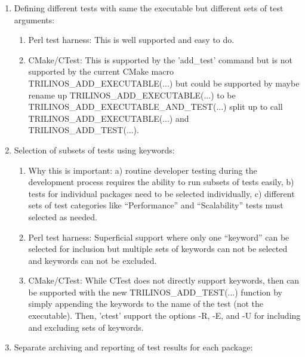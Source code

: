 \documentclass[pdf,ps2pdf,11pt]{SANDreport}
\begin{document}
\begin{enumerate}

{}\item Defining different tests with same the executable but
different sets of test arguments:

  \begin{enumerate}

  {}\item Perl test harness: This is well supported and easy to do.

  {}\item CMake/CTest: This is supported by the 'add\_test' command
  but is not supported by the current CMake macro
  TRILINOS\_ADD\_EXECUTABLE(...) but could be supported by maybe
  rename up TRILINOS\_ADD\_EXECUTABLE(...) to be
  TRILINOS\_ADD\_EXECUTABLE\_AND\_TEST(...) split up to call
  TRILINOS\_ADD\_EXECUTABLE(...) and TRILINOS\_ADD\_TEST(...).

  \end{enumerate}

{}\item Selection of subsets of tests using keywords:

  \begin{enumerate}

  {}\item Why this is important: a) routine developer testing during
  the development process requires the ability to run subsets of tests
  easily, b) tests for individual packages need to be selected
  individually, c) different sets of test categories like
  ``Performance'' and ``Scalability'' tests must selected as needed.

  {}\item Perl test harness: Superficial support where only one
  ``keyword'' can be selected for inclusion but multiple sets of
  keywords can not be selected and keywords can not be excluded.

  {}\item CMake/CTest: While CTest does not directly support keywords,
  then can be supported with the new TRILINOS\_ADD\_TEST(...) function
  by simply appending the keywords to the name of the test (not the
  executable).  Then, 'ctest' support the options -R, -E, and -U for
  including and excluding sets of keywords.

  \end{enumerate}

{}\item Separate archiving and reporting of test results for each
package:


\end{enumerate}
\end{document}
